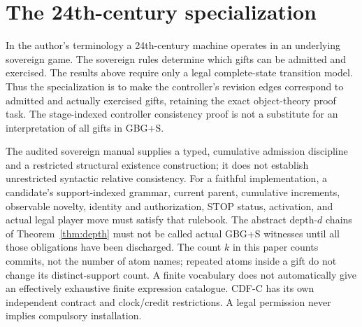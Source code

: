 \documentclass[11pt]{article}
\theoremstyle{remark}\newtheorem{remark}[theorem]{Remark}
\begin{document}
\section{The 24th-century specialization}\label{sec:sovereign}
In the author's terminology a 24th-century machine operates in an underlying sovereign game. The sovereign rules determine which gifts can be admitted and exercised. The results above require only a legal complete-state transition model. Thus the specialization is to make the controller's revision edges correspond to admitted and actually exercised gifts, retaining the exact object-theory proof task. The stage-indexed controller consistency proof is not a substitute for an interpretation of all gifts in GBG+S.

The audited sovereign manual \cite{gift} supplies a typed, cumulative admission discipline and a restricted structural existence construction; it does not establish unrestricted syntactic relative consistency. For a faithful implementation, a candidate's support-indexed grammar, current parent, cumulative increments, observable novelty, identity and authorization, STOP status, activation, and actual legal player move must satisfy that rulebook. The abstract depth-$d$ chains of Theorem~\ref{thm:depth} must not be called actual GBG+S witnesses until all those obligations have been discharged. The count $k$ in this paper counts commits, not the number of atom names; repeated atoms inside a gift do not change its distinct-support count. A finite vocabulary does not automatically give an effectively exhaustive finite expression catalogue. CDF-C has its own independent contract and clock/credit restrictions. A legal permission never implies compulsory installation.
\end{document}
